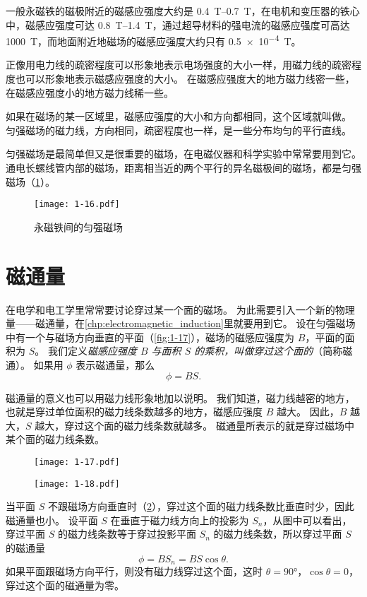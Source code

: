 一般永磁铁的磁极附近的磁感应强度大约是 \qtyrange{0.4}{0.7}{T}，在电机和变压器的铁心中，磁感应强度可达 \qtyrange{0.8}{1.4}{T}，通过超导材料的强电流的磁感应强度可高达 \qty{1000}{T}，而地面附近地磁场的磁感应强度大约只有 \qty{0.5e-4}{T}。

正像用电力线的疏密程度可以形象地表示电场强度的大小一样，用磁力线的疏密程度也可以形象地表示磁感应强度的大小。
在磁感应强度大的地方磁力线密一些，在磁感应强度小的地方磁力线稀一些。

如果在磁场的某一区域里，磁感应强度的大小和方向都相同，这个区域就叫做。
匀强磁场的磁力线，方向相同，疏密程度也一样，是一些分布均匀的平行直线。

匀强磁场是最简单但又是很重要的磁场，在电磁仪器和科学实验中常常要用到它。
通电长螺线管内部的磁场，距离相当近的两个平行的异名磁极间的磁场，都是匀强磁场（\cref{fig:1-16}）。

\begin{figure}
  \texttt{[image: 1-16.pdf]}
  \caption{永磁铁间的匀强磁场}\label{fig:1-16}
\end{figure}

\section{磁通量}
在电学和电工学里常常要讨论穿过某一个面的磁场。
为此需要引入一个新的物理量——磁通量，在\cref{chp:electromagnetic_induction}里就要用到它。
设在匀强磁场中有一个与磁场方向垂直的平面（\cref{fig:1-17}），磁场的磁感应强度为 $B$，平面的面积为 $S$。
我们定义\emph{磁感应强度 $B$ 与面积 $S$ 的乘积，叫做穿过这个面的}（简称磁通）。
如果用 $\phi$ 表示磁通量，那么
\[\phi=BS.\]

磁通量的意义也可以用磁力线形象地加以说明。
我们知道，磁力线越密的地方，也就是穿过单位面积的磁力线条数越多的地方，磁感应强度 $B$ 越大。
因此，$B$ 越大，$S$ 越大，穿过这个面的磁力线条数就越多。
磁通量所表示的就是穿过磁场中某个面的磁力线条数。

\begin{figure}
  \begin{minipage}[b]{0.48\linewidth}\centering
    \texttt{[image: 1-17.pdf]}
    \caption{}\label{fig:1-17}
  \end{minipage}
  \begin{minipage}[b]{0.48\linewidth}\centering
    \texttt{[image: 1-18.pdf]}
    \caption{}\label{fig:1-18}
  \end{minipage}
\end{figure}


当平面 $S$ 不跟磁场方向垂直时（\cref{fig:1-18}），穿过这个面的磁力线条数比垂直时少，因此磁通量也小。
设平面 $S$ 在垂直于磁力线方向上的投影为 $S_n$，从图中可以看出，穿过平面 $S$ 的磁力线条数等于穿过投影平面 $S_n$ 的磁力线条数，所以穿过平面 $S$ 的磁通量
\[\phi=BS_n=BS\cos\theta.\]
如果平面跟磁场方向平行，则没有磁力线穿过这个面，这时 $\theta=\ang{90}$，$\cos\theta=0$，穿过这个面的磁通量为零。

